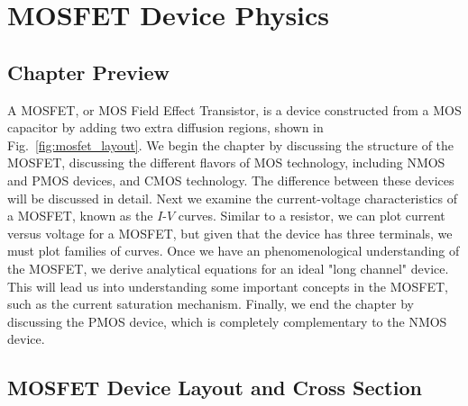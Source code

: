 \chapter{MOSFET Device Physics}
\label{ch:ch08_mos}
\graphicspath{{./figs_mos/}}
\section{Chapter Preview}
A MOSFET, or MOS Field Effect Transistor, is a device constructed from a MOS capacitor by adding two extra diffusion regions, shown in Fig.~\ref{fig:mosfet_layout}.  We begin the chapter by discussing the structure of the MOSFET, discussing the different flavors of MOS technology, including NMOS and PMOS devices, and CMOS technology.  The difference between these devices will be discussed in detail.  Next we examine the current-voltage characteristics of a MOSFET, known as the $I$-$V$ curves.  Similar to a resistor, we can plot current versus voltage for a MOSFET, but given that the device has three terminals, we must plot families of curves.  Once we have an phenomenological understanding of the MOSFET, we derive analytical equations for an ideal "long channel" device.  This will lead us into understanding some important concepts in the MOSFET, such as the current saturation mechanism.  Finally, we end the chapter by discussing the PMOS device, which is completely complementary to the NMOS device.
\section{MOSFET Device Layout and Cross Section}
